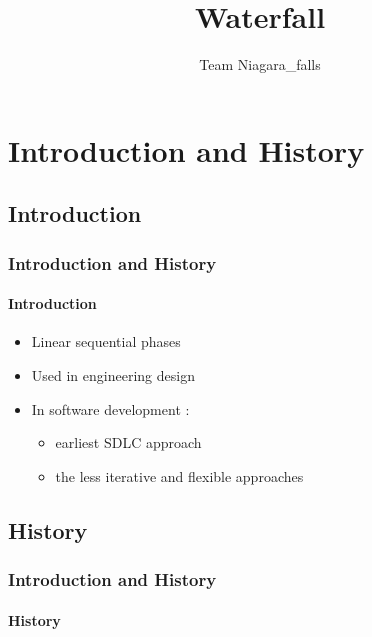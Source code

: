 \documentclass[10pt]{beamer}
\title{Waterfall}
\author{Team Niagara\_falls}
\date{}
\begin{document}
\frame{\titlepage}
\begin{frame}
    \tableofcontents
\end{frame}



\section{Introduction and History}
\subsection{Introduction}
\begin{frame}
\frametitle{Introduction and History}
\framesubtitle{Introduction}
\begin{itemize}
    \item Linear sequential phases
    \item Used in engineering design
    \item In software development : 
    \begin{itemize}
        \item earliest SDLC approach
        \item the less iterative and flexible approaches
    \end{itemize}    
\end{itemize}
\end{frame}

\subsection{History}
\begin{frame}
\frametitle{Introduction and History}
\framesubtitle{History}
\startchronology
[startyear=1950,stopyear=1990]
\stopchronology
    
\end{frame}


\end{document}
